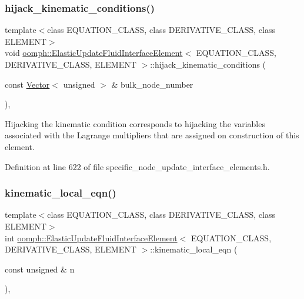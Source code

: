 \subsubsection{\texorpdfstring{hijack\+\_\+kinematic\+\_\+conditions()}{hijack\_kinematic\_conditions()}}
{\footnotesize\ttfamily template$<$class E\+Q\+U\+A\+T\+I\+O\+N\+\_\+\+C\+L\+A\+SS, class D\+E\+R\+I\+V\+A\+T\+I\+V\+E\+\_\+\+C\+L\+A\+SS, class E\+L\+E\+M\+E\+NT$>$ \\
void \hyperlink{classoomph_1_1ElasticUpdateFluidInterfaceElement}{oomph\+::\+Elastic\+Update\+Fluid\+Interface\+Element}$<$ E\+Q\+U\+A\+T\+I\+O\+N\+\_\+\+C\+L\+A\+SS, D\+E\+R\+I\+V\+A\+T\+I\+V\+E\+\_\+\+C\+L\+A\+SS, E\+L\+E\+M\+E\+NT $>$\+::hijack\+\_\+kinematic\+\_\+conditions (\begin{DoxyParamCaption}\item[{const \hyperlink{classoomph_1_1Vector}{Vector}$<$ unsigned $>$ \&}]{bulk\+\_\+node\+\_\+number }\end{DoxyParamCaption})\hspace{0.3cm}{\ttfamily [inline]}, {\ttfamily [private]}}



Hijacking the kinematic condition corresponds to hijacking the variables associated with the Lagrange multipliers that are assigned on construction of this element. 



Definition at line 622 of file specific\+\_\+node\+\_\+update\+\_\+interface\+\_\+elements.\+h.

\mbox{\label{classoomph_1_1ElasticUpdateFluidInterfaceElement_a940840693906b7b8d619ff97f521c811}} 
\subsubsection{\texorpdfstring{kinematic\+\_\+local\+\_\+eqn()}{kinematic\_local\_eqn()}}
{\footnotesize\ttfamily template$<$class E\+Q\+U\+A\+T\+I\+O\+N\+\_\+\+C\+L\+A\+SS, class D\+E\+R\+I\+V\+A\+T\+I\+V\+E\+\_\+\+C\+L\+A\+SS, class E\+L\+E\+M\+E\+NT$>$ \\
int \hyperlink{classoomph_1_1ElasticUpdateFluidInterfaceElement}{oomph\+::\+Elastic\+Update\+Fluid\+Interface\+Element}$<$ E\+Q\+U\+A\+T\+I\+O\+N\+\_\+\+C\+L\+A\+SS, D\+E\+R\+I\+V\+A\+T\+I\+V\+E\+\_\+\+C\+L\+A\+SS, E\+L\+E\+M\+E\+NT $>$\+::kinematic\+\_\+local\+\_\+eqn (\begin{DoxyParamCaption}\item[{const unsigned \&}]{n }\end{DoxyParamCaption})\hspace{0.3cm}{\ttfamily [inline]}, {\ttfamily [private]}}



